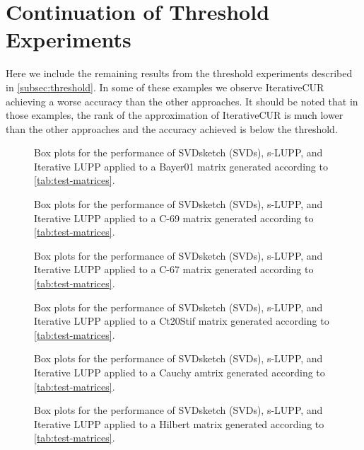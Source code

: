 \section{Continuation of Threshold Experiments}
Here we include the remaining results from the threshold experiments described in \cref{subsec:threshold}. In some of these examples we observe IterativeCUR achieving a worse accuracy than the other approaches. It should be noted that in those examples, the rank of the approximation of IterativeCUR is much lower than the other approaches and the accuracy achieved is below the threshold.
\begin{figure}[H]
    \centering
    
    \caption{Box plots for the performance of  SVDsketch (SVDs), s-LUPP, and Iterative LUPP applied to a Bayer01 matrix generated according to \cref{tab:test-matrices}.}
    \label{fig:bayer01}
\end{figure}
\begin{figure}[H]
    \centering
    
    \caption{Box plots for the performance of  SVDsketch (SVDs), s-LUPP, and Iterative LUPP applied to a C-69 matrix generated according to \cref{tab:test-matrices}.}
    \label{fig:c-69}
\end{figure}
\begin{figure}[H]
    \centering
    
    \caption{Box plots for the performance of  SVDsketch (SVDs), s-LUPP, and Iterative LUPP applied to a C-67 matrix generated according to \cref{tab:test-matrices}.}
    \label{fig:c-67}
\end{figure}
\begin{figure}[H]
    \centering
    
    \caption{Box plots for the performance of  SVDsketch (SVDs), s-LUPP, and Iterative LUPP applied to a Ct20Stif matrix generated according to \cref{tab:test-matrices}.}
    \label{fig:ct20stif}
\end{figure}
\begin{figure}[H]
    \centering
    
    \caption{Box plots for the performance of  SVDsketch (SVDs), s-LUPP, and Iterative LUPP applied to a Cauchy amtrix generated according to \cref{tab:test-matrices}.}
    \label{fig:cauchy}
\end{figure}
\begin{figure}[H]
    \centering
    
    \caption{Box plots for the performance of  SVDsketch (SVDs), s-LUPP, and Iterative LUPP applied to  a Hilbert matrix generated according to  \cref{tab:test-matrices}.}
    \label{fig:hilbert}
\end{figure}

